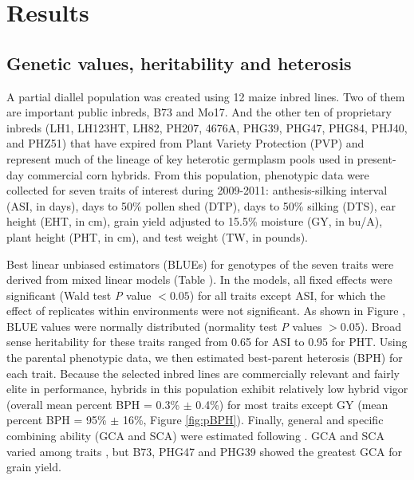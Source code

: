 \documentclass[9pt,twocolumn,twoside]{gsajnl}
\begin{document}
\section*{Results}


\subsection*{Genetic values, heritability and heterosis}

A partial diallel population was created using 12 maize inbred lines\DIFdelbegin {}\DIFdelend . 
Two of them are important public inbreds, B73 and Mo17. And the other ten of proprietary inbreds (LH1, LH123HT, LH82, PH207, 4676A, PHG39, PHG47, PHG84, PHJ40, and PHZ51) that have expired from Plant Variety Protection (PVP) and represent much of the lineage of key heterotic germplasm pools used in present-day commercial corn hybrids. 
From this population, phenotypic data were collected for seven traits of interest during 2009-2011: anthesis-silking interval (ASI, in days), days to 50\% pollen shed (DTP), days to 50\% silking (DTS), ear height (EHT, in cm), grain yield adjusted to 15.5\% moisture (GY, in bu/A), plant height (PHT, in cm), and test weight (TW, in pounds).

Best linear unbiased estimators (BLUEs) for genotypes of the seven traits were derived from mixed linear models (Table \DIFdelbegin {}\DIFdelend \DIFaddbegin \DIFadd{\ref{table:table_s1}}\DIFaddend ).
In the models, all fixed effects were significant (Wald test \emph{P} value $<0.05$) for all traits except ASI, for which the effect of replicates within environments were not significant. 
As shown in Figure \DIFdelbegin {}\DIFdelend \DIFaddbegin \DIFadd{\ref{fig:pheno}}\DIFaddend , BLUE values were normally distributed (normality test \emph{P} values $>0.05$). 
Broad sense heritability for these traits ranged from 0.65 for ASI to 0.95 for PHT. 
Using the parental phenotypic data, we then estimated best-parent heterosis (BPH) for each trait.  
Because the selected inbred lines are commercially relevant and fairly elite in performance, hybrids in this population exhibit relatively low hybrid vigor (overall mean percent BPH = 0.3\% $\pm$ 0.4\%) for most traits except GY (mean percent BPH = 95\% $\pm$ 16\%, Figure \ref{fig:pBPH}). 
Finally, general and specific combining ability (GCA and SCA) were estimated following \citep{Falconer1996}. 
GCA and SCA varied among traits \DIFdelbegin \DIFdelend \DIFaddbegin {}\DIFaddend , but B73, PHG47 and PHG39 showed the greatest GCA \DIFdelbegin \DIFdelend for grain yield.
\end{document}
